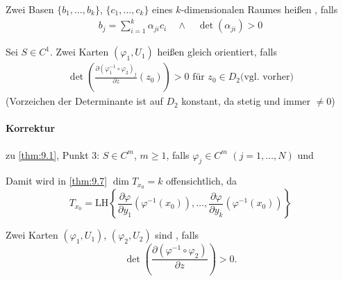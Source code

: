 \begin{theorem} \label{thm:9.8}
  \begin{enum-arab}
    \item Zwei Basen $\{b_1,\ldots,b_k\}$, $\{c_1,\ldots,c_k\}$ eines $k$-dimensionalen Raumes heißen , falls
    \begin{align*}
      b_j = \sum\limits_{i=1}^{k} \alpha_{ji} c_i \quad\land\quad \det(\alpha_{ji}) > 0
    \end{align*}
    
    \item Sei $S \in C^1$. Zwei Karten $(\varphi_1,U_1)$ heißen gleich orientiert, falls
    \begin{align*}
      \det \left( \frac{\partial \left( \varphi_1^{-1} \circ \varphi_2 \right)_j}{\partial z}(z_0) \right) > 0 \text{ für } z_0 \in D_2 \text{(vgl. vorher)}
    \end{align*}
    (Vorzeichen der Determinante ist auf $D_2$ konstant, da stetig und immer $\neq 0$)
  \end{enum-arab}
\end{theorem}


\paragraph{Korrektur} zu \ref{thm:9.1}, Punkt 3: $S \in C^m$, $m \geq 1$, falls $\varphi_j \in C^m$ $(j = 1,\ldots,N)$ und 

Damit wird in \ref{thm:9.7} $\dim T_{x_0} = k$ offensichtlich, da \[ T_{x_0} = \mathrm{LH}\left\{ \frac{\partial \varphi}{\partial y_1} \left( \varphi^{-1}(x_0) \right),\ldots,\frac{\partial \varphi}{\partial y_k} \left( \varphi^{-1}(x_0) \right) \right\} \]

\begin{notice*}[Ergänzung:]
  Zwei Karten $(\varphi_1,U_1)$, $(\varphi_2,U_2)$ sind  , falls \[ \det\left( \frac{\partial(\varphi^{-1} \circ \varphi_2)}{\partial z} \right) > 0. \]
\end{notice*}

